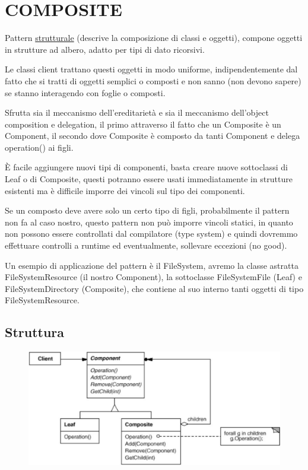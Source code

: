 \chapter{COMPOSITE}

Pattern \underline{strutturale} (descrive la composizione di classi e oggetti), compone oggetti in strutture ad albero, adatto per tipi di dato ricorsivi.

Le classi client trattano questi oggetti in modo uniforme, indipendentemente dal fatto che si tratti di oggetti semplici o composti e non sanno (non 
devono sapere) se stanno interagendo con foglie o composti.

Sfrutta sia il meccanismo dell'ereditarietà e sia il meccanismo dell'object composition e delegation, il primo attraverso il fatto che un Composite è un Component, 
il secondo dove Composite è composto da tanti Component e delega operation() ai figli.

È facile aggiungere nuovi tipi di componenti, basta creare nuove sottoclassi di Leaf o di Composite, questi potranno essere usati immediatamente in strutture 
esistenti ma è difficile imporre dei vincoli sul tipo dei componenti.

Se un composto deve avere solo un certo tipo di figli, probabilmente il pattern non fa al caso nostro, questo pattern non può imporre vincoli statici, in 
quanto non possono essere controllati dal compilatore (type system) e quindi dovremmo effettuare controlli a runtime ed eventualmente, sollevare eccezioni (no good).

Un esempio di applicazione del pattern è il FileSystem, avremo la classe astratta FileSystemResource (il nostro Component), la sottoclasse FileSystemFile (Leaf) e 
FileSystemDirectory (Composite), che contiene al suo interno tanti oggetti di tipo FileSystemResource.

\section{Struttura}

\begin{figure}[H]
    \centering
    \includegraphics[width=0.5\linewidth]{../../immagini/composite/struttura_composite}
\end{figure}

